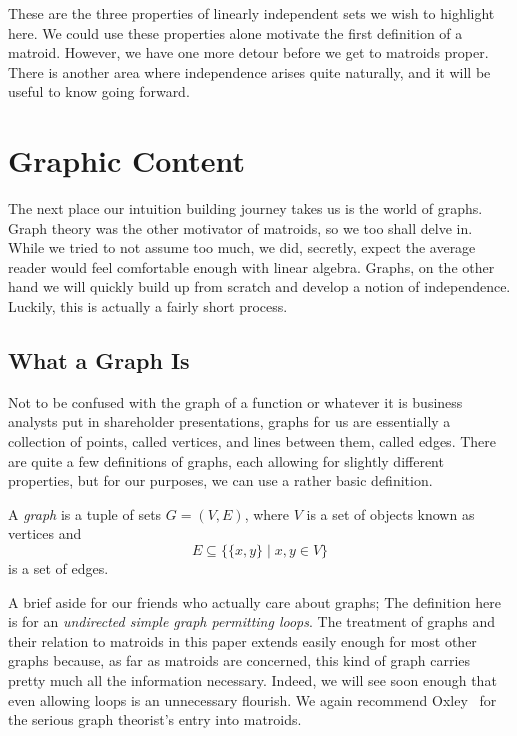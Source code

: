 \documentclass[12pt,oneside]{../../sfsuthesis}
\begin{document}
These are the three properties of linearly independent sets we wish to highlight here.
We could use these properties alone motivate the first definition of a matroid.
However, we have one more detour before we get to matroids proper.
There is another area where independence arises quite naturally, and it will be useful to know going forward.

\section{Graphic Content}

The next place our intuition building journey takes us is the world of graphs.
Graph theory was the other motivator of matroids, so we too shall delve in.
While we tried to not assume too much, we did, secretly, expect the average reader would feel comfortable enough with linear algebra.
Graphs, on the other hand we will quickly build up from scratch and develop a notion of independence.
Luckily, this is actually a fairly short process.

\subsection{What a Graph Is}
Not to be confused with the graph of a function or whatever it is business analysts put in shareholder presentations, graphs for us are essentially a collection of points, called vertices, and lines between them, called edges.
There are quite a few definitions of graphs, each allowing for slightly different properties, but for our purposes, we can use a rather basic definition.
\begin{definition}[Graph]\label{def:graph}

    A \emph{graph} is a tuple of sets \( G = (V, E) \), where \( V \) is a set of objects known as vertices and
    \[
        E \subseteq \big\{ \{x, y\} \; | \; x, y \in V \big\}
    \]
    is a set of edges.
\end{definition}
A brief aside for our friends who actually care about graphs;
The definition here is for an \emph{undirected simple graph permitting loops}.
The treatment of graphs and their relation to matroids in this paper extends easily enough for most other graphs because, as far as matroids are concerned, this kind of graph carries pretty much all the information necessary.
Indeed, we will see soon enough that even allowing loops is an unnecessary flourish.
We again recommend Oxley~\cite{oxleyMatroidTheory2011} for the serious graph theorist's entry into matroids.
\end{document}
